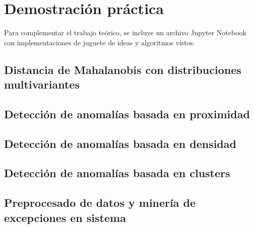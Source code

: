 \chapter{Demostración práctica}
Para complementar el trabajo teórico, se incluye un archivo Jupyter Notebook con
implementaciones de juguete de ideas y algoritmos vistos.

\section{Distancia de Mahalanobis con distribuciones multivariantes}

\section{Detección de anomalías basada en proximidad}

\section{Detección de anomalías basada en densidad}

\section{Detección de anomalías basada en clusters}

\section{Preprocesado de datos y minería de excepciones en sistema }
